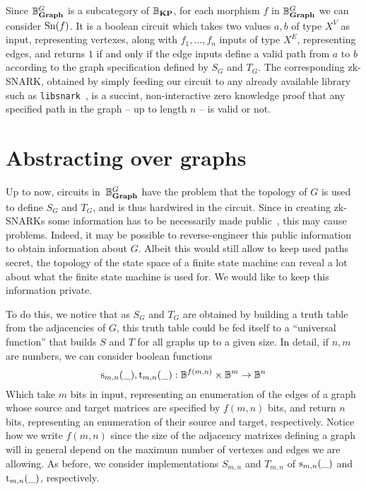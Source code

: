 \documentclass[preliminary,copyright,creativecommons,sharealike,noncommercial]{eptcs}
\begin{document}
Since $\mathbb{B}^{G}_{\textbf{Graph}}$ is a subcategory of $\mathbb{B}_\textbf{KP}$, for each
morphism $f$ in $\mathbb{B}^{G}_{\textbf{Graph}}$ we can consider $\operatorname{Sn}(f)$.
It is a boolean circuit which takes 
two values $a,b$ of type $X^V$ as input, representing vertexes, 
along with $f_1, \dots, f_n$ inputs of type $X^E$, representing 
edges, and returns $1$ if and only if the edge inputs define a valid path 
from $a$ to $b$ according to the graph specification defined by $S_G$ and $T_G$.
The corresponding zk-SNARK, obtained by simply feeding our circuit to 
any already available library such as \texttt{libsnark}~\cite{Scipr-lab2012}, is a succint,
non-interactive zero knowledge proof that any specified 
path in the graph -- up to length $n$ -- is valid or not.
%
%
%
\section{Abstracting over graphs}\label{sec: abstracting over graphs}
%
%
Up to now, circuits in~$\mathbb{B}^{G}_{\textbf{Graph}}$ have the problem that 
the topology of $G$ is used to define $S_G$ and $T_G$, and is thus 
hardwired in the circuit. Since in creating zk-SNARKs some 
information has to be necessarily made public~\cite{Gennaro2013}, this may cause 
problems. Indeed, it may be possible to reverse-engineer this 
public information to obtain information about $G$. Albeit 
this would still allow to keep used paths secret, the topology 
of the state space of a finite state machine can reveal a lot about 
what the finite state machine is used for. We would like to keep this 
information private.

To do this, we notice that as $S_G$ and $T_G$ are obtained by building 
a truth table from the adjacencies of $G$, this truth 
table could be fed itself to a ``universal function'' that builds $S$ and $T$
for all graphs up to a given size. In detail, if $n, m$ are numbers, 
we can consider boolean functions
%
%
\begin{equation*}
  \operatorname{s}_{m,n}(\_), \operatorname{t}_{m,n}(\_): \mathbb{B}^{f(m,n)} \times \mathbb{B}^m \to \mathbb{B}^n 
\end{equation*}
%
Which take $m$ bits in input, representing an enumeration of 
the edges of a graph whose source and target matrices are 
specified by $f(m,n)$ bits, and return $n$ bits, representing
an enumeration of their source and target, respectively. Notice how we 
write $f(m,n)$ since the size of the adjacency matrixes defining 
a graph will in general depend on the maximum number of 
vertexes and edges we are allowing. As before, we consider implementations $S_{m,n}$ 
and $T_{m,n}$ of $\operatorname{s}_{m,n}(\_)$ and $\operatorname{t}_{m,n}(\_)$, 
respectively.
\end{document}
